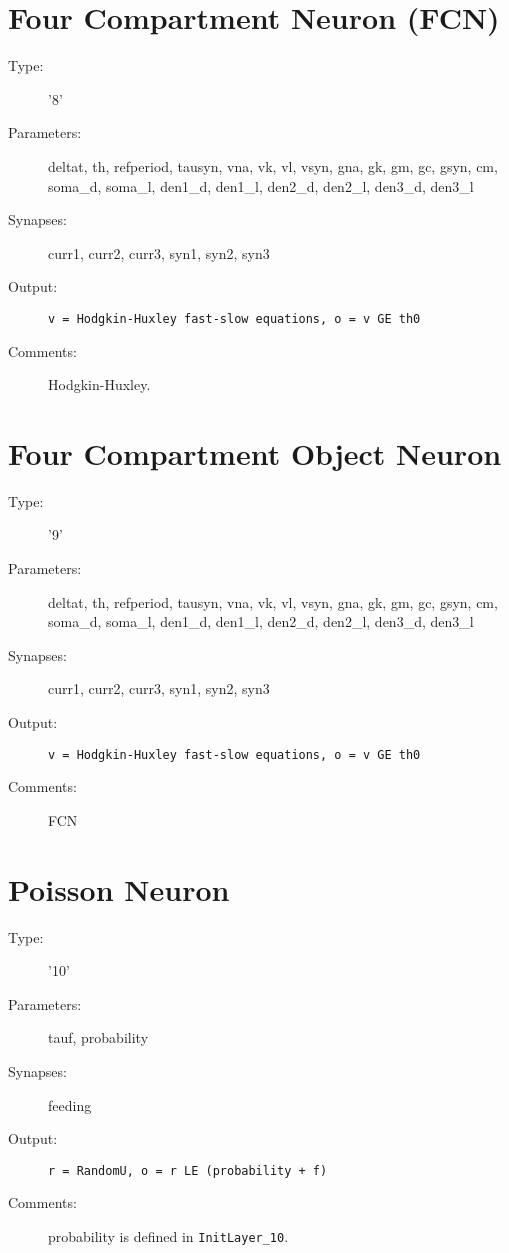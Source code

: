 \documentclass[12pt]{article}
\begin{document}
\section{Four Compartment Neuron (FCN)}
\begin{description}
\item[Type:] '8'

\item[Parameters:] deltat, th, refperiod, tausyn, vna, vk, vl, vsyn, gna, gk, gm, 
                gc, gsyn, cm, soma\_d, soma\_l, den1\_d, den1\_l, den2\_d, den2\_l,
                den3\_d, den3\_l

\item[Synapses:] curr1, curr2, curr3, syn1, syn2, syn3

\item[Output:] \texttt{v = Hodgkin-Huxley fast-slow equations, o = v GE th0}

\item[Comments:] Hodgkin-Huxley.
\end{description}



\section{Four Compartment Object Neuron}
\begin{description}
\item[Type:] '9'

\item[Parameters:] deltat, th, refperiod, tausyn, vna, vk, vl, vsyn, gna, gk, gm,
              gc, gsyn, cm, soma\_d, soma\_l, den1\_d, den1\_l, den2\_d, den2\_l,
              den3\_d, den3\_l

\item[Synapses:] curr1, curr2, curr3, syn1, syn2, syn3

\item[Output:] \texttt{v = Hodgkin-Huxley fast-slow equations, o = v GE th0}

\item[Comments:] FCN
\end{description}



\section{Poisson Neuron}
\begin{description}
\item[Type:] '10'

\item[Parameters:] tauf, probability

\item[Synapses:] feeding

\item[Output:] \texttt{r = RandomU, o = r LE (probability + f)}

\item[Comments:] probability is defined in \texttt{InitLayer\_10}.
\end{description}
\end{document}
